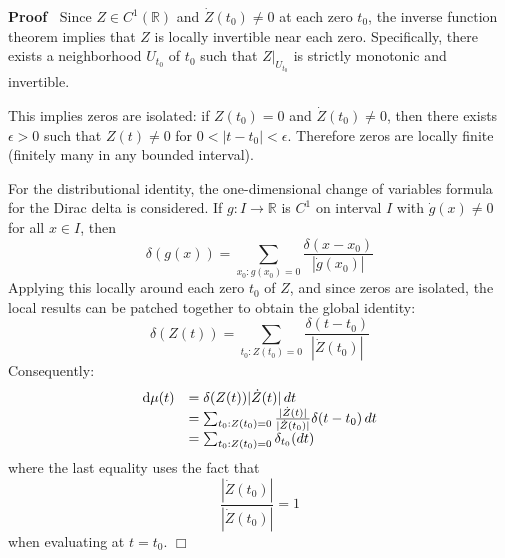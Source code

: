 \documentclass{article}
\newcommand{\mathd}{\mathrm{d}}
\newenvironment{proof}{\noindent\textbf{Proof\ }}{\hspace*{\fill}$\Box$\medskip}
\begin{document}
\begin{proof}
  Since $Z \in C^1 (\mathbb{R})$ and $\dot{Z} (t_0) \neq 0$ at each zero
  $t_0$, the inverse function theorem implies that $Z$ is locally invertible
  near each zero. Specifically, there exists a neighborhood $U_{t_0}$ of $t_0$
  such that $Z|_{U_{t_0}}$ is strictly monotonic and invertible.
  
  This implies zeros are isolated: if $Z (t_0) = 0$ and $\dot{Z} (t_0) \neq
  0$, then there exists $\epsilon > 0$ such that $Z (t) \neq 0$ for $0 < |t -
  t_0 | < \epsilon$. Therefore zeros are locally finite (finitely many in any
  bounded interval).
  
  For the distributional identity, the one-dimensional change of variables
  formula for the Dirac delta is considered. If $g : I \to \mathbb{R}$ is
  $C^1$ on interval $I$ with $\dot{g} (x) \neq 0$ for all $x \in I$, then
  \begin{equation}
    \delta (g (x)) = \sum_{x_0 : g (x_0) = 0} \frac{\delta (x - x_0)}{|
    \dot{g} (x_0) |}
  \end{equation}
  Applying this locally around each zero $t_0$ of $Z$, and since zeros are
  isolated, the local results can be patched together to obtain the global
  identity:
  \begin{equation}
    \delta (Z (t)) = \sum_{t_0 : Z (t_0) = 0} \frac{\delta (t - t_0)}{|
    \dot{Z} (t_0) |}
  \end{equation}
  Consequently:
  \begin{equation}
    \begin{array}{ll}
      \mathd \mu (t) & = \delta (Z (t)) | \dot{Z} (t) |  \hspace{0.17em} dt\\
      & = \sum_{t_0 : Z (t_0) = 0} \frac{| \dot{Z} (t) |}{| \dot{Z} (t_0) |}
      \delta (t - t_0)  \hspace{0.17em} dt\\
      & = \sum_{t_0 : Z (t_0) = 0} \delta_{t_0}  (dt)
    \end{array}
  \end{equation}
  where the last equality uses the fact that
  \begin{equation}
    \frac{| \dot{Z} (t_0) |}{| \dot{Z} (t_0) |} = 1
  \end{equation}
  when evaluating at $t = t_0$.
\end{proof}
\end{document}
